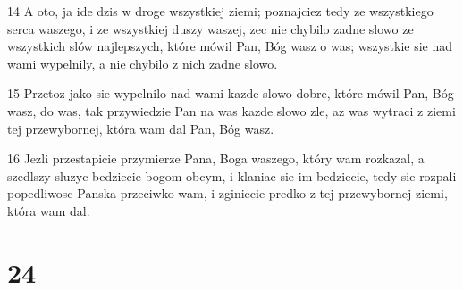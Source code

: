 \par 14 A oto, ja ide dzis w droge wszystkiej ziemi; poznajciez tedy ze wszystkiego serca waszego, i ze wszystkiej duszy waszej, zec nie chybilo zadne slowo ze wszystkich slów najlepszych, które mówil Pan, Bóg wasz o was; wszystkie sie nad wami wypelnily, a nie chybilo z nich zadne slowo.
\par 15 Przetoz jako sie wypelnilo nad wami kazde slowo dobre, które mówil Pan, Bóg wasz, do was, tak przywiedzie Pan na was kazde slowo zle, az was wytraci z ziemi tej przewybornej, która wam dal Pan, Bóg wasz.
\par 16 Jezli przestapicie przymierze Pana, Boga waszego, który wam rozkazal, a szedlszy sluzyc bedziecie bogom obcym, i klaniac sie im bedziecie, tedy sie rozpali popedliwosc Panska przeciwko wam, i zginiecie predko z tej przewybornej ziemi, która wam dal.

\chapter{24}

